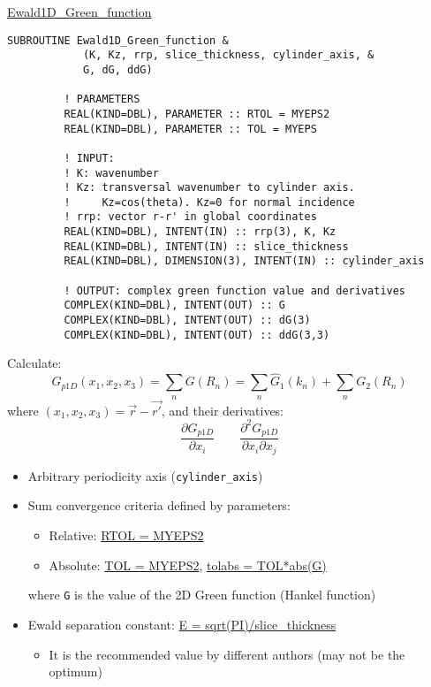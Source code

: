 
\begin{frame}{\url{Ewald1D_Green_function}}
  
  \begin{lstlisting}[style=myFORTRANcodeS]
      SUBROUTINE Ewald1D_Green_function &
            (K, Kz, rrp, slice_thickness, cylinder_axis, &
            G, dG, ddG)

         ! PARAMETERS
         REAL(KIND=DBL), PARAMETER :: RTOL = MYEPS2
         REAL(KIND=DBL), PARAMETER :: TOL = MYEPS

         ! INPUT:
         ! K: wavenumber
         ! Kz: transversal wavenumber to cylinder axis.
         !     Kz=cos(theta). Kz=0 for normal incidence
         ! rrp: vector r-r' in global coordinates
         REAL(KIND=DBL), INTENT(IN) :: rrp(3), K, Kz
         REAL(KIND=DBL), INTENT(IN) :: slice_thickness
         REAL(KIND=DBL), DIMENSION(3), INTENT(IN) :: cylinder_axis

         ! OUTPUT: complex green function value and derivatives
         COMPLEX(KIND=DBL), INTENT(OUT) :: G 
         COMPLEX(KIND=DBL), INTENT(OUT) :: dG(3)
         COMPLEX(KIND=DBL), INTENT(OUT) :: ddG(3,3)
  \end{lstlisting}

  Calculate:
  \[
    G_{p1D}(x_1,x_2,x_3)=\sum_n G(R_n) = \sum_n \hat{G}_1(k_n) + \sum_n G_2(R_n)
  \]
  where \((x_1,x_2,x_3)=\vec{r} - \vec{r'}\), and their derivatives:
  \[
    \frac{\partial G_{p1D}}{\partial x_i} \qquad \frac{\partial^2 G_{p1D}}{\partial x_i\partial x_j}
  \]

  \begin{itemize}\small
    \item Arbitrary periodicity axis ({\lstinline!cylinder_axis!}) 
    \item Sum convergence criteria defined by parameters:
      \begin{itemize}\footnotesize
        \item Relative: {\url{RTOL = MYEPS2}}
        \item Absolute: {\url{TOL = MYEPS2}}, {\url{tolabs = TOL*abs(G)}}
      \end{itemize}
      where {\lstinline!G!} is the value of the 2D Green function (Hankel function)
    \item Ewald separation constant: 
      {\url{E = sqrt(PI)/slice_thickness}}
      \begin{itemize}\footnotesize
        \item It is the recommended value by different authors (may not be the optimum)
      \end{itemize}
  \end{itemize}


\end{frame}

